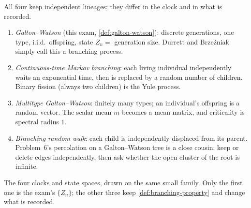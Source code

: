 \documentclass[11pt,a4paper]{article}
\begin{document}
\begin{example}
\label{ex:branching-models}
All four keep independent lineages; they differ in the clock and in what is recorded.
\begin{enumerate}[label=\textup{(\arabic*)}]
    \item
    \emph{Galton--Watson} (this exam, \cref{def:galton-watson}): discrete generations, one type, i.i.d.\ offspring, state \(Z_n=\) generation size. Durrett and Brze\'zniak simply call this a branching process.
    \item
    \emph{Continuous-time Markov branching}: each living individual independently waits an exponential time, then is replaced by a random number of children. Binary fission (always two children) is the Yule process.
    \item
    \emph{Multitype Galton--Watson}: finitely many types; an individual's offspring is a random vector. The scalar mean \(m\) becomes a mean matrix, and criticality is spectral radius \(1\).
    \item
    \emph{Branching random walk}: each child is independently displaced from its parent. Problem~6's percolation on a Galton--Watson tree is a close cousin: keep or delete edges independently, then ask whether the open cluster of the root is infinite.
\end{enumerate}
\end{example}

The four clocks and state spaces, drawn on the same small family. Only the first one is the exam's \(\{Z_n\}\); the other three keep \cref{def:branching-property} and change what is recorded.
\end{document}
